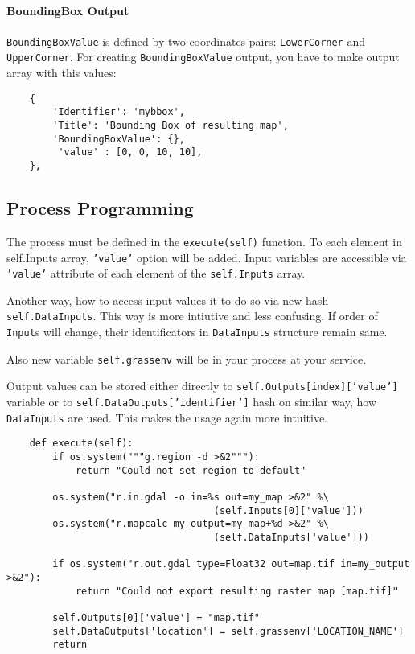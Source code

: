 \documentclass[a4paper,11pt]{article}
\begin{document}
    \paragraph{BoundingBox Output}
    \texttt{BoundingBoxValue} is defined by two coordinates pairs:
    \texttt{LowerCorner} and \texttt{UpperCorner}. For creating
    \texttt{BoundingBoxValue}    output, you have to make output array with this
    values:
    \begin{verbatim}
    {
        'Identifier': 'mybbox',
        'Title': 'Bounding Box of resulting map',
        'BoundingBoxValue': {},
         'value' : [0, 0, 10, 10],
    },
    \end{verbatim}


    \subsection{Process Programming}
     
    The process must be defined in the \texttt{execute(self)} function. To
    each element in self.Inputs array, \texttt{'value'} option will be added.
    Input variables are accessible via \texttt{'value'} attribute of each element of the
    \texttt{self.Inputs} array. 

    Another way, how to access input values it to do so via new hash \texttt{self.DataInputs}. This way is 
    more intiutive and less confusing. If order of \texttt{Input}s will change, their identificators in \texttt{DataInputs} structure remain same.
    
    Also new variable \texttt{self.grassenv} will be in your process at your service.

    Output values can be stored either directly to \texttt{self.Outputs[index]['value']} variable or to \texttt{self.DataOutputs['identifier']} hash on similar way, how \texttt{DataInputs} are used. This makes the usage again more intuitive.

    \begin{verbatim}
    def execute(self):
        if os.system("""g.region -d >&2"""):
            return "Could not set region to default"

        os.system("r.in.gdal -o in=%s out=my_map >&2" %\
                                    (self.Inputs[0]['value']))
        os.system("r.mapcalc my_output=my_map+%d >&2" %\
                                    (self.DataInputs['value']))
        
        if os.system("r.out.gdal type=Float32 out=map.tif in=my_output >&2"):
            return "Could not export resulting raster map [map.tif]"

        self.Outputs[0]['value'] = "map.tif"
        self.DataOutputs['location'] = self.grassenv['LOCATION_NAME']
        return
    \end{verbatim}
\end{document}
